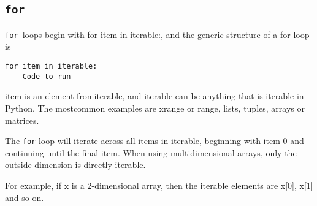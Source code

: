 \documentclass[KSmain.tex]{subfiles}
\begin{document}
\subsection{\texttt{for}}
\texttt{for }loops begin with for item in iterable:, and the generic structure of a for loop is
\begin{verbatim}
for item in iterable:
	Code to run
\end{verbatim}
item is an element fromiterable, and iterable can be anything that is iterable in Python. The mostcommon
examples are xrange or range, lists, tuples, arrays or matrices. 

The \texttt{for} loop will iterate across all items in
iterable, beginning with item 0 and continuing until the final item. When using multidimensional arrays,
only the outside dimension is directly iterable. 

For example, if x is a 2-dimensional array, then the iterable
elements are x[0], x[1] and so on.
\end{document}

